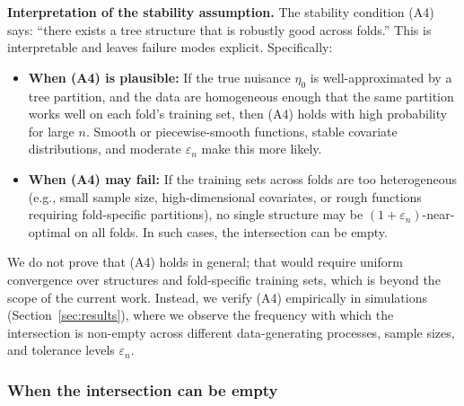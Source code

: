 \documentclass[12pt]{article}
\begin{document}
\noindent\textbf{Interpretation of the stability assumption.}
The stability condition (A4) says: ``there exists a tree structure that is robustly good across folds.'' This is interpretable and leaves failure modes explicit. Specifically:
\begin{itemize}
\item \textbf{When (A4) is plausible:} If the true nuisance $\eta_0$ is well-approximated by a tree partition, and the data are homogeneous enough that the same partition works well on each fold's training set, then (A4) holds with high probability for large $n$. Smooth or piecewise-smooth functions, stable covariate distributions, and moderate $\varepsilon_n$ make this more likely.
\item \textbf{When (A4) may fail:} If the training sets across folds are too heterogeneous (e.g., small sample size, high-dimensional covariates, or rough functions requiring fold-specific partitions), no single structure may be $(1+\varepsilon_n)$-near-optimal on all folds. In such cases, the intersection can be empty.
\end{itemize}

We do not prove that (A4) holds in general; that would require uniform convergence over structures and fold-specific training sets, which is beyond the scope of the current work. Instead, we verify (A4) empirically in simulations (Section~\ref{sec:results}), where we observe the frequency with which the intersection is non-empty across different data-generating processes, sample sizes, and tolerance levels $\varepsilon_n$.

\subsubsection{When the intersection can be empty}
\end{document}
